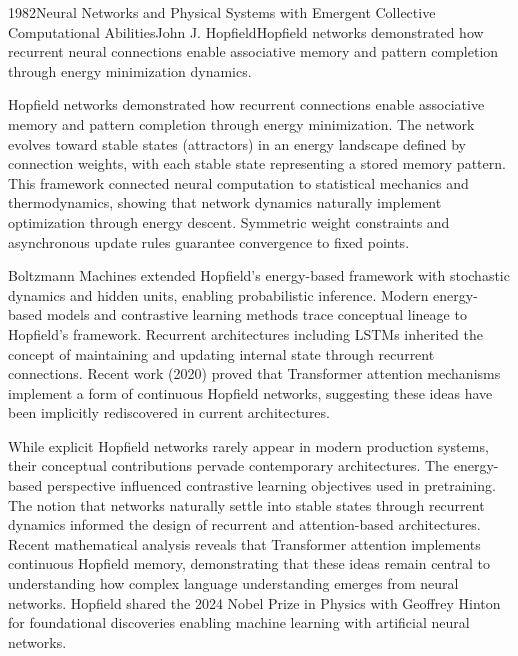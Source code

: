 
\begin{papersummary}{1982}{Neural Networks and Physical Systems with Emergent Collective Computational Abilities}{John J. Hopfield}{Hopfield networks demonstrated how recurrent neural connections enable associative memory and pattern completion through energy minimization dynamics.}

Hopfield networks demonstrated how recurrent connections enable associative memory and pattern completion through energy minimization. The network evolves toward stable states (attractors) in an energy landscape defined by connection weights, with each stable state representing a stored memory pattern. This framework connected neural computation to statistical mechanics and thermodynamics, showing that network dynamics naturally implement optimization through energy descent. Symmetric weight constraints and asynchronous update rules guarantee convergence to fixed points.

Boltzmann Machines extended Hopfield's energy-based framework with stochastic dynamics and hidden units, enabling probabilistic inference. Modern energy-based models and contrastive learning methods trace conceptual lineage to Hopfield's framework. Recurrent architectures including LSTMs inherited the concept of maintaining and updating internal state through recurrent connections. Recent work (2020) proved that Transformer attention mechanisms implement a form of continuous Hopfield networks, suggesting these ideas have been implicitly rediscovered in current architectures.

While explicit Hopfield networks rarely appear in modern production systems, their conceptual contributions pervade contemporary architectures. The energy-based perspective influenced contrastive learning objectives used in pretraining. The notion that networks naturally settle into stable states through recurrent dynamics informed the design of recurrent and attention-based architectures. Recent mathematical analysis reveals that Transformer attention implements continuous Hopfield memory, demonstrating that these ideas remain central to understanding how complex language understanding emerges from neural networks. Hopfield shared the 2024 Nobel Prize in Physics with Geoffrey Hinton for foundational discoveries enabling machine learning with artificial neural networks.

\end{papersummary}
